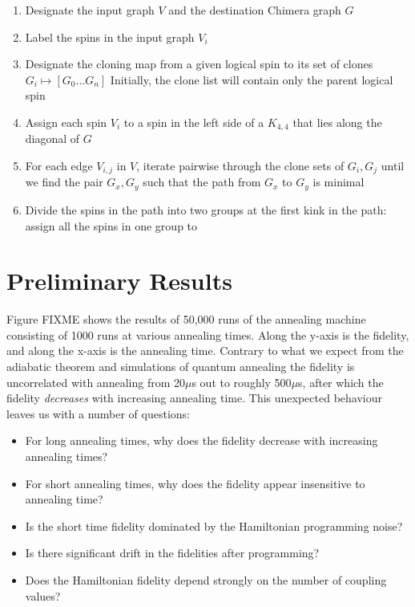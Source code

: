 \documentclass[12pt]{dalthesis}
\begin{document}
\begin{enumerate}
	\item Designate the input graph $V$ and the destination Chimera graph $G$
	\item Label the spins in the input graph $V_i$
	\item Designate the cloning map from a given logical spin to its set of clones $G_i \mapsto [G_0 \ldots G_n] $ Initially, the
		clone list will contain only the parent logical spin
	\item Assign each spin $V_i$ to a spin in the left side of a $K_{4,4}$ that lies along the diagonal of $G$
	\item For each edge $V_{i,j}$ in $V$, iterate pairwise through the clone sets of $G_i,G_j$ until we find the pair $G_x,G_y$ such that
		the path from $G_x$ to $G_y$ is minimal
	\item Divide the spins in the path into two groups at the first kink in the path: assign all the spins in one group to 
\end{enumerate}

\chapter{Preliminary Results}

Figure FIXME shows the results of 50,000 runs of the annealing machine consisting of 1000 runs at various annealing times.  Along the y-axis is the fidelity, and along the x-axis is the annealing time.  Contrary to what we expect from the adiabatic theorem and simulations of quantum annealing the fidelity is uncorrelated with annealing from 20$\mu$s out to roughly 500$ \mu$s, after which the fidelity \emph{decreases} with increasing annealing time.  This unexpected behaviour leaves us with a number of questions:

\begin{itemize}
	\item For long annealing times, why does the fidelity decrease with increasing annealing times?
	\item For short annealing times, why does the fidelity appear insensitive to annealing time?
	\item Is the short time fidelity dominated by the Hamiltonian programming noise?
	\item Is there significant drift in the fidelities after programming?
	\item Does the Hamiltonian fidelity depend strongly on the number of coupling values?
\end{itemize}



\end{document}
